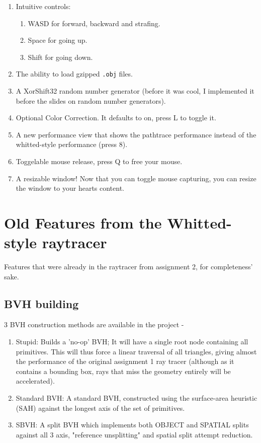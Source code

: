 \begin{enumerate}
    \item Intuitive controls: 
        \begin{enumerate}
            \item WASD for forward, backward and strafing.
            \item Space for going up.
            \item Shift for going down.
        \end{enumerate}
    \item The ability to load gzipped \verb:.obj: files.
    \item A XorShift32 random number generator (before it was cool, I implemented it before the slides on random number generators).
    \item Optional Color Correction. It defaults to on, press L to toggle it.
    \item A new performance view that shows the pathtrace performance instead of the whitted-style performance (press 8).
    \item Toggelable mouse release, press Q to free your mouse.
    \item A resizable window! Now that you can toggle mouse capturing, you can resize the window to your hearts content.
\end{enumerate}




\section{Old Features from the Whitted-style raytracer}
Features that were already in the raytracer from assignment 2, for completeness' sake.

\subsection{BVH building}
3 BVH construction methods are available in the project -
    \begin{enumerate}
        \item Stupid: Builds a 'no-op' BVH; It will have a single root node containing all primitives. This will thus force a linear traversal of all triangles, giving almost the performance of the original assignment 1 ray tracer (although as it contains a bounding box, rays that miss the geometry entirely will be accelerated).
        \item Standard BVH: A standard BVH, constructed using the surface-area heuristic (SAH) against the longest axis of the set of primitives.
        \item SBVH: A split BVH which implements both OBJECT and SPATIAL splits against all 3 axis, "reference unsplitting" and spatial split attempt reduction.
    \end{enumerate}

